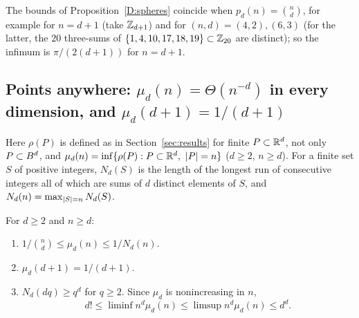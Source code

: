 \documentclass[11pt]{article}
\begin{document}
The bounds of Proposition~\ref{D:spheres} coincide when $p_d(n)=\binom nd$, for example for
$n=d+1$ (take $\mathbb{Z}_{d+1}$) and for $(n,d)=(4,2),(6,3)$ (for the latter, the $20$ three-sums of $\{1,4,10,17,18,19\}\subset\mathbb{Z}_{20}$ are distinct); so the infimum is $\pi/(2(d+1))$ for $n=d+1$.

\subsection{Points anywhere: \texorpdfstring{$\mu_d(n)=\Theta(n^{-d})$}{mu\_d(n) = Theta(n\textasciicircum -d)} in every dimension, and \texorpdfstring{$\mu_d(d+1)=1/(d+1)$}{mu\_d(d+1) = 1/(d+1)}}
\label{sec:D-anywhere}

Here $\rho(P)$ is defined as in Section~\ref{sec:results} for finite $P\subset\mathbb{R}^d$, not only $P\subset B^d$, and
$\mu_d(n)=\inf\{\rho(P):P\subset\R^d,\ \abs{P}=n\}$ ($d\ge2$, $n\ge d$). For a finite set $S$ of positive integers,
$N_d(S)$ is the length of the longest run of consecutive integers all of which are sums of $d$ distinct elements
of $S$, and $N_d(n)=\max_{\left|S\right|=n}N_d(S)$.

\begin{proposition}\label{D:anywhere}
For $d\ge2$ and $n\ge d$:
\begin{enumerate}[label=(\roman*)]
  \item $1/\binom{n}{d}\le\mu_d(n)\le1/N_d(n)$.
  \item $\mu_d(d+1)=1/(d+1)$.
  \item $N_d(dq)\ge q^d$ for $q\ge2$. Since $\mu_d$ is nonincreasing in $n$,
    \[
      d!\le\liminf n^d\mu_d(n)\le\limsup n^d\mu_d(n)\le d^d.
    \]
\end{enumerate}
\end{proposition}
\end{document}
